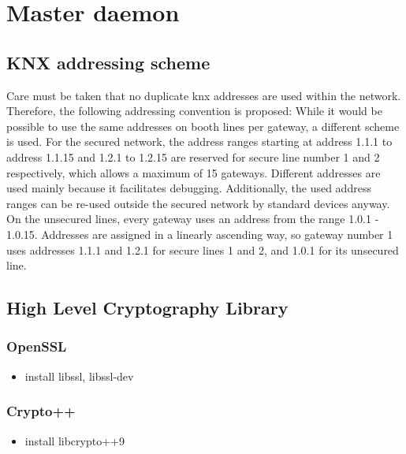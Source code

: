 \section{Master daemon}

\subsection{KNX addressing scheme}

Care must be taken that no duplicate knx addresses are used within the network. Therefore, the following addressing convention is proposed:
While it would be possible to use the same addresses on booth lines per gateway, a different scheme is used.
For the secured network, the address ranges starting at address 1.1.1 to address 1.1.15 and 1.2.1 to 1.2.15 are reserved for secure line number
1 and 2 respectively, which allows a maximum of 15 gateways. Different addresses are used mainly because it facilitates debugging. Additionally, the used
address ranges can be re-used outside the secured network by standard devices anyway.
On the unsecured lines, every gateway uses an address from the range 1.0.1 - 1.0.15. Addresses are assigned in a linearly ascending way, so gateway number 1
uses addresses 1.1.1 and 1.2.1 for secure lines 1 and 2, and 1.0.1 for its unsecured line.

\subsection{High Level Cryptography Library}

\subsubsection{OpenSSL}

\begin{itemize}
 \item install libssl, libssl-dev
\end{itemize}

\subsubsection{Crypto++}
\begin{itemize}
 \item install  libcrypto++9
\end{itemize}

